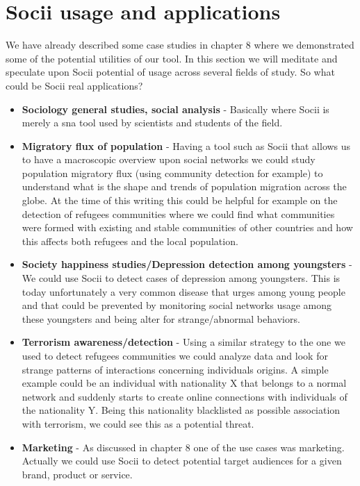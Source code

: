 \section{Socii usage and applications}
We have already described some case studies in chapter 8 where we demonstrated some of the potential utilities of our tool. In this section we will meditate and speculate upon Socii potential of usage across several fields of study. So what could be Socii real applications?

\begin{itemize}
    \item \textbf{Sociology general studies, social analysis} - Basically where Socii is merely a \gls{sna} tool used by scientists and students of the field.
    \item \textbf{Migratory flux of population} - Having a tool such as Socii that allows us to have a macroscopic overview upon social networks we could study population migratory flux (using community detection for example) to understand what is the shape and trends of population migration across the globe. At the time of this writing this could be helpful for example on the detection of refugees communities where we could find what communities were formed with existing and stable communities of other countries and how this affects both refugees and the local population.
    \item \textbf{Society happiness studies/Depression detection among youngsters} - We could use Socii to detect cases of depression among youngsters. This is today unfortunately a very common disease that urges among young people and that could be prevented by monitoring social networks usage among these youngsters and being alter
    for strange/abnormal behaviors.
    \item \textbf{Terrorism awareness/detection} - Using a similar strategy to the one we used to detect refugees communities we could analyze data and look for strange patterns of interactions concerning individuals origins. A simple example could be an individual with nationality X that belongs to a normal network and suddenly starts to create online connections with individuals of the nationality Y. Being this nationality blacklisted as possible association with terrorism, we could see this as a potential threat.
    \item \textbf{Marketing} - As discussed in chapter 8 one of the use cases was marketing. Actually we could use Socii to detect potential target audiences for a given brand, product or service.
\end{itemize}

